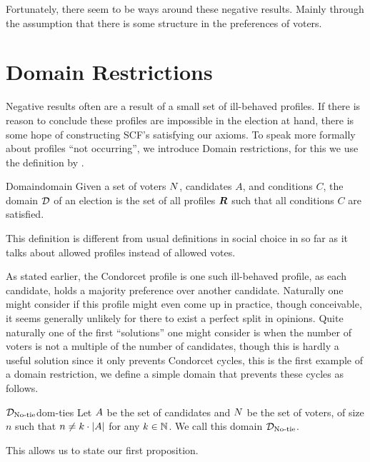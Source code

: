 Fortunately, there seem to be ways around these negative results. Mainly
through the assumption that there is some structure in the preferences of
voters.

\section{Domain Restrictions} \label{sec:Domain-res}

Negative results often are a result of a small set of ill-behaved profiles. If there is
reason to conclude these profiles are impossible in the election at hand, there
is some hope of constructing SCF's satisfying our axioms. To speak more
formally about profiles ``not occurring'', we introduce Domain restrictions, for
this we use the definition by
\citet{elkindPreferenceRestrictionsComputational2022}.

\begin{definition}{Domain}{domain}
	{
		Given a set of voters $N$, candidates $A$, and conditions $C$, the domain $\mathcal{D}_{\textnormal{}}$ of an election is the set of all profiles $\boldsymbol{R}$ such that all conditions $C$ are satisfied.
	}
\end{definition}

This definition is different from usual definitions in social choice in so far as it talks about allowed profiles instead of allowed votes.

As stated earlier, the Condorcet profile is one such ill-behaved profile, as
each candidate, holds a majority preference over another candidate.
Naturally one might consider if this profile might even come up in practice,
though conceivable, it seems generally unlikely for there to exist a perfect
split in opinions. Quite naturally one of the first ``solutions'' one might
consider is when the number of voters is not a multiple of the number of
candidates, though this is hardly a useful solution since it only prevents
Condorcet cycles, this is the first example of a domain restriction, we define a
simple domain that prevents these cycles as follows.

\begin{definition}{$\mathcal{D}_{\textnormal{No-tie}}$}{dom-ties}
	Let $A$ be the set of candidates and $N$ be the set of voters, of size $n$ such that $n \neq k \cdot |A|$ for any $k \in \mathbb{N}$. We call this domain $\mathcal{D}_{\textnormal{No-tie}}$.
\end{definition}

This allows us to state our first proposition.

